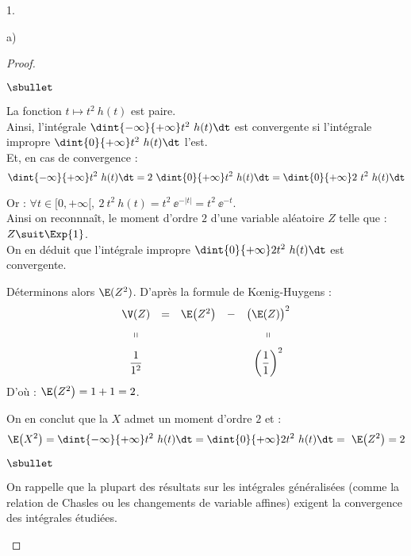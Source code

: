 \begin{noliste}{1.}
\begin{noliste}{a)}
\begin{proof}
\begin{noliste}{$\sbullet$}
      \item La fonction $t \mapsto t^2 \ h(t)$ est paire.\\[.2cm]
        Ainsi, l'intégrale $\dint{-\infty}{+\infty} t^2 \ h(t) \dt$
        est convergente si l'intégrale impropre $\dint{0}{+\infty} t^2
        \ h(t) \dt$ l'est.\\[.2cm]
        Et, en cas de convergence :
        \[
        \dint{-\infty}{+\infty} t^2 \ h(t) \dt = 2 \ \dint{0}{+\infty}
        t^2 \ h(t) \dt = \dint{0}{+\infty} 2 \ t^2 \ h(t) \dt
        \]

      \item Or : $\forall t \in [0, +\infty[, \ 2 \ t^2 \ h(t) = t^2 \
        \ee^{-|t|} = t^2 \ \ee^{-t}$.\\
        Ainsi on reconnnaît, le moment d'ordre $2$ d'une variable
        aléatoire $Z$ telle que : $Z \suit \Exp{1}$.\\[.1cm]
        On en déduit que l'intégrale impropre $\dint{0}{+\infty} 2 t^2
        \ h(t) \dt$ est convergente.

      \item Déterminons alors $\E(Z^2)$. D'après la formule de
        K\oe{}nig-Huygens :
        \[
        \begin{array}{ccccc}
          \V(Z) & = & \E\big( Z^2 \big) & - & \big( \E(Z) \big)^2 
          \\[.2cm]
          \shortparallel & & & & \shortparallel
          \\[.2cm]
          \dfrac{1}{1^2} & & & & \left( \dfrac{1}{1} \right)^2
        \end{array}
        \]
        D'où : $\E\big( Z^2 \big) = 1 + 1 = 2$.

      \item On en conclut que la \var $X$ admet un moment d'ordre $2$
        et :
        \[
        \E\big( X^2 \big) = \dint{-\infty}{+\infty} t^2 \ h(t) \dt =
        \dint{0}{+\infty} 2 t^2 \ h(t) \dt = \ \E\big( Z^2 \big) = 2
        \]
      \end{noliste}
      \begin{remark}%
        \begin{noliste}{$\sbullet$}
        \item On rappelle que la plupart des résultats sur les
          intégrales généralisées (comme la relation de Chasles ou les
          changements de variable affines) exigent la convergence des
          intégrales étudiées.


\end{noliste}
\end{remark}
\end{proof}
\end{noliste}
\end{noliste}
